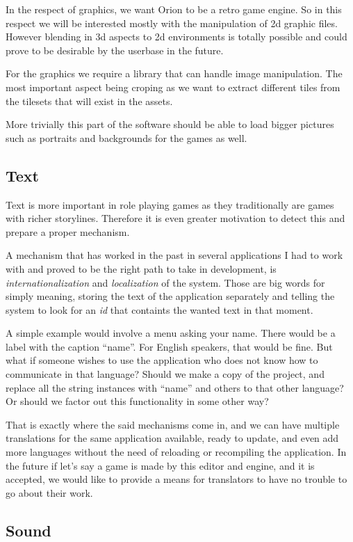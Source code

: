 In the respect of graphics, we want Orion to be a retro game engine. So in this
respect we will be interested mostly with the manipulation of 2d graphic files.
However blending in 3d aspects to 2d environments is totally possible and could
prove to be desirable by the userbase in the future.

For the graphics we require a library that can handle image manipulation. The
most important aspect being croping as we want to extract different tiles from
the tilesets that will exist in the assets.

More trivially this part of the software should be able to load bigger pictures
such as portraits and backgrounds for the games as well.

\subsection{Text}

Text is more important in role playing games as they traditionally are games
with richer storylines. Therefore it is even greater motivation to detect this
and prepare a proper mechanism.

A mechanism that has worked in the past in several applications I had to work
with and proved to be the right path to take in development, is
\textit{internationalization} and \textit{localization} of the system. Those
are big words for simply meaning, storing the text of the application separately
and telling the system to look for an \textit{id} that containts the wanted
text in that moment.

A simple example would involve a menu asking your name. There would be a label
with the caption ``name''. For English speakers, that would be fine. But what
if someone wishes to use the application who does not know how to communicate
in that language? Should we make a copy of the project, and replace all the
string instances with ``name'' and others to that other language? Or should we
factor out this functionality in some other way?

That is exactly where the said mechanisms come in, and we can have multiple
translations for the same application available, ready to update, and even add
more languages without the need of reloading or recompiling the application. In
the future if let's say a game is made by this editor and engine, and it is
accepted, we would like to provide a means for translators to have no trouble to
go about their work.

\subsection{Sound}

